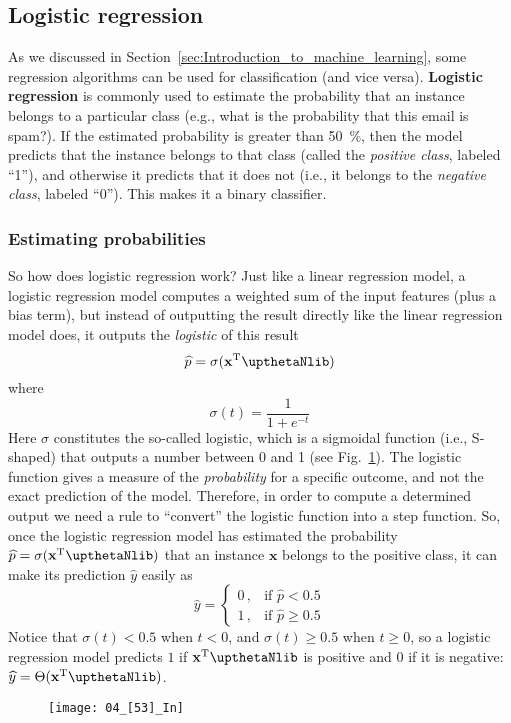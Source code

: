 \subsection{Logistic regression}
As we discussed in Section~\ref{sec:Introduction_to_machine_learning}, some regression algorithms can be used for classification (and vice versa). \textbf{Logistic regression} is commonly used to estimate the probability that an instance belongs to a particular class (e.g., what is the probability that this email is spam?). If the estimated probability is greater than \SI{50}{\percent}, then the model predicts that the instance belongs to that class (called the \emph{positive class}, labeled ``1''), and otherwise it predicts that it does not (i.e., it belongs to the \emph{negative class}, labeled ``0''). This makes it a binary classifier.
\subsubsection{Estimating probabilities}
So how does logistic regression work? Just like a linear regression model, a logistic regression model computes a weighted sum of the input features (plus a bias term), but instead of outputting the result directly like the linear regression model does, it outputs the \emph{logistic} of this result
\begin{equation}
\widehat{p}=\sigma(\mathbf{x}^{\mathrm{T}}\boldtheta)%
\end{equation}
where
\begin{equation}
\sigma(t)=\frac{1}{1+e^{-t}}
\end{equation}
Here $\sigma$ constitutes the so-called logistic, which is a sigmoidal function (i.e., S-shaped) that outputs a number between 0 and 1 (see Fig.~\ref{04_[53]_In}). The logistic function gives a measure of the \emph{probability} for a specific outcome, and not the exact prediction of the model. Therefore, in order to compute a determined output we need a rule to ``convert'' the logistic function into a step function. So, once the logistic regression model has estimated the probability $\widehat{p}=\sigma(\mathbf{x}^{\mathrm{T}}\boldtheta)$ that an instance $\mathbf{x}$ belongs to the positive class, it can make its prediction $\widehat{y}$ easily as
\begin{equation}
\widehat{y}=\begin{cases}
0\,,&\text{if $\widehat{p}<0.5$}\\
1\,,&\text{if $\widehat{p}\geq0.5$}
\end{cases}
\end{equation}
Notice that $\sigma(t)<0.5$ when $t<0$, and $\sigma(t)\geq0.5$ when $t\geq0$, so a logistic regression model predicts $1$ if $\mathbf{x}^{\mathrm{T}}\boldtheta$ is positive and 0 if it is negative: $\widehat{y}=\Theta(\mathbf{x}^{\mathrm{T}}\boldtheta)$.
\begin{figure}[h!t]
\centering
\texttt{[image: 04\_[53]\_In]}
\caption{}\label{04_[53]_In}
\end{figure}

